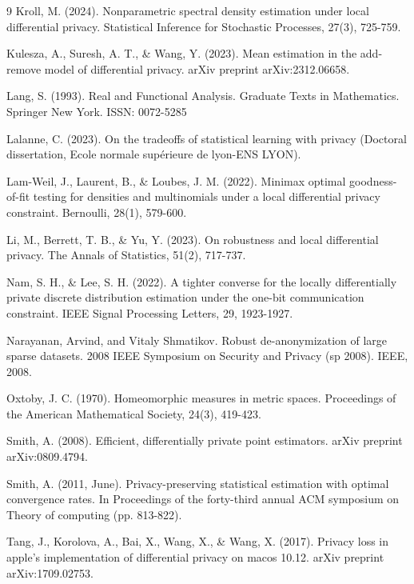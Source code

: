 \documentclass[a4paper, 11pt]{article}
\theoremstyle{definition}
\begin{document}
{\begin{thebibliography}{9}
 Kroll, M. (2024). Nonparametric spectral density estimation under local differential privacy. Statistical Inference for Stochastic Processes, 27(3), 725-759.

 Kulesza, A., Suresh, A. T., \& Wang, Y. (2023). Mean estimation in the add-remove model of differential privacy. arXiv preprint arXiv:2312.06658.


 Lang, S. (1993). Real and Functional Analysis. Graduate Texts in Mathematics. Springer New York. ISSN: 0072-5285
	
 Lalanne, C. (2023). On the tradeoffs of statistical learning with privacy (Doctoral dissertation, Ecole normale supérieure de lyon-ENS LYON).

 Lam-Weil, J., Laurent, B., \& Loubes, J. M. (2022). Minimax optimal goodness-of-fit testing for densities and multinomials under a local differential privacy constraint. Bernoulli, 28(1), 579-600.

 Li, M., Berrett, T. B., \& Yu, Y. (2023). On robustness and local differential privacy. The Annals of Statistics, 51(2), 717-737.

 Nam, S. H., \& Lee, S. H. (2022). A tighter converse for the locally differentially private discrete distribution estimation under the one-bit communication constraint. IEEE Signal Processing Letters, 29, 1923-1927.

 Narayanan, Arvind, and Vitaly Shmatikov. Robust de-anonymization of large sparse datasets. 2008 IEEE Symposium on Security and Privacy (sp 2008). IEEE, 2008.

 Oxtoby, J. C. (1970). Homeomorphic measures in metric spaces. Proceedings of the American Mathematical Society, 24(3), 419-423.

 Smith, A. (2008). Efficient, differentially private point estimators. arXiv preprint arXiv:0809.4794.

 Smith, A. (2011, June). Privacy-preserving statistical estimation with optimal convergence rates. In Proceedings of the forty-third annual ACM symposium on Theory of computing (pp. 813-822).

 Tang, J., Korolova, A., Bai, X., Wang, X., \& Wang, X. (2017). Privacy loss in apple's implementation of differential privacy on macos 10.12. arXiv preprint arXiv:1709.02753.



\end{thebibliography}}
\end{document}
